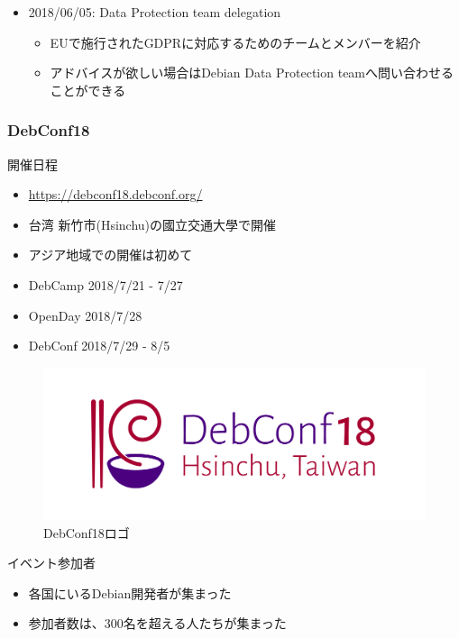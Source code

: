 \documentclass[mingoth,a4paper]{jsarticle}
\begin{document}
\begin{itemize}
\item 2018/06/05:  Data Protection team delegation
  \begin{itemize}
  \item EUで施行されたGDPRに対応するためのチームとメンバーを紹介
  \item アドバイスが欲しい場合はDebian Data Protection teamへ問い合わせることができる
  \end{itemize}
\end{itemize}


\subsubsection{DebConf18}

開催日程
\begin{itemize}    
\item \url{https://debconf18.debconf.org/}
\item 台湾 新竹市(Hsinchu)の國立交通大學で開催
\item アジア地域での開催は初めて
\item DebCamp 2018/7/21 - 7/27
\item OpenDay 2018/7/28
\item DebConf 2018/7/29 - 8/5
\end{itemize}

\begin{figure}[htbp]
  \begin{center}
    \includegraphics[scale=1.0]{image201810/DebConf18_Horizontal_Logo.png}
  \end{center}
  \caption{DebConf18ロゴ}      
\end{figure}

イベント参加者
\begin{itemize}
\item 各国にいるDebian開発者が集まった
\item 参加者数は、300名を超える人たちが集まった
\end{itemize}
\end{document}
